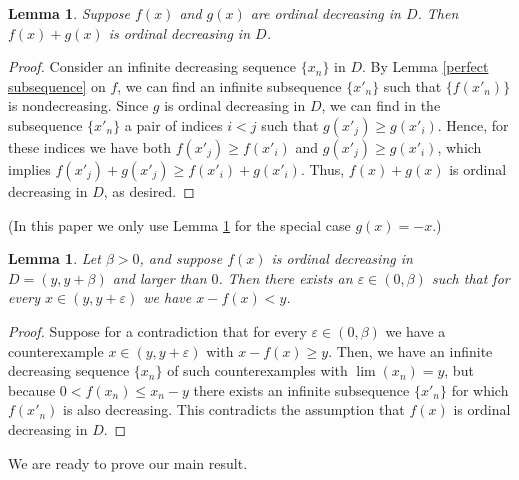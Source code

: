\documentclass{article}
\newtheorem{Lemma}[Theorem]{Lemma}
\theoremstyle{definition}
\begin{document}
    \begin{Lemma}
        \label{closed to addition}
        Suppose $f(x)$ and $g(x)$ are ordinal decreasing in $D$. Then $f(x)+g(x)$ is ordinal decreasing in $D$.
    \end{Lemma}
    \begin{proof}
        Consider an infinite decreasing sequence $\{x_n\}$ in $D$. By Lemma \ref{perfect subsequence} on $f$, we can find an infinite subsequence $\{x'_n\}$ such that $\{f(x'_n)\}$ is nondecreasing. Since $g$ is ordinal decreasing in $D$, we can find in the subsequence $\{x'_n\}$ a pair of indices $i<j$ such that $g(x'_j) \geq g(x'_i)$. Hence, for these indices we have both $f(x'_j)\ge f(x'_i)$ and $g(x'_j)\ge g(x'_i)$, which implies $f(x'_j)+g(x'_j) \geq f(x'_i)+g(x'_i)$. Thus, $f(x)+g(x)$ is ordinal decreasing in $D$, as desired.
    \end{proof}
    (In this paper we only use Lemma \ref{closed to addition} for the special case $g(x)=-x$.)
    \begin{Lemma}
    \label{eventual increase}
        Let $\beta>0$, and suppose $f(x)$ is ordinal decreasing in $D=(y,y+\beta)$ and larger than $0$. Then there exists an $\varepsilon\in(0,\beta)$ such that for every $x\in(y,y+\varepsilon)$ we have $x-f(x)<y$.
    \end{Lemma}
    \begin{proof}
        Suppose for a contradiction that for every $\varepsilon\in(0,\beta)$ we have a counterexample $x\in(y,y+\varepsilon)$ with $ x-f(x) \geq y $. Then, we have an infinite decreasing sequence $\{x_n\}$ of such counterexamples with $\lim(x_n)=y$, but because $0<f(x_n)\leq x_n-y$ there exists an infinite subsequence $\{x'_n\}$ for which $f(x'_n)$ is also decreasing. This contradicts the assumption that $f(x)$ is ordinal decreasing in $D$.
    \end{proof}
    We are ready to prove our main result.
\end{document}
